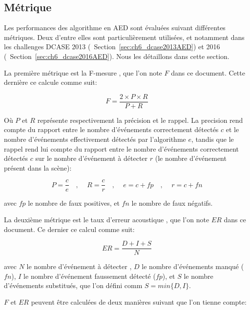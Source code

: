 
\subsection{Métrique}
\label{sec:ch6_metriqueAED}

Les performances des algorithme en AED sont évaluées suivant différentes métriques. Deux d'entre elles sont particulièrement utilisées, et notamment dans les challenges DCASE 2013 (\cf~Section~\ref{sec:ch6_dcase2013AED}) et 2016 (\cf~Section~\ref{sec:ch6_dcase2016AED}). Nous les détaillons dans cette section.

La première métrique est la F-mesure \citep{Giannoulis:2013a,Stowell15}, que l'on note $F$ dans ce document. Cette dernière ce calcule comme suit:

\begin{equation}
F=\dfrac{2\times P \times R}{P+R}
\end{equation}

Où $P$ et $R$ représente respectivement la précision et le rappel. La precision rend compte du rapport entre le nombre d'événements correctement détectés $c$ et le nombre d'événements effectivement détectés par l'algorithme $e$, tandis que le rappel rend lui compte du rapport entre le nombre d'événements correctement détectés $c$ sur le nombre d'événement à détecter $r$ (le nombre d'événement présent dans la scène):

\begin{equation}
P=\dfrac{c}{e}  \quad \textrm{, } \quad R=\dfrac{c}{r} \quad \textrm{, } \quad  e=c+fp \quad \textrm{, } \quad  r=c+fn
\end{equation}

avec $fp$ le nombre de faux positives, et $fn$ le nombre de faux négatifs.


La deuxième métrique est le taux d'erreur acoustique \citep{poliner2007discriminative,clear}, que l'on note $ER$ dans ce document. Ce dernier ce calcul comme suit:

\begin{equation}
ER=\dfrac{D+I+S}{N}
\end{equation}

avec $N$ le nombre d'événement à détecter , $D$ le nombre d'événements manqué ($fn$), $I$ le nombre d'événement faussement détecté ($fp$), et $S$ le nombre d'événements substitués, que l'on défini comm $S=min\lbrace D,I\rbrace$.

$F$ et $ER$ peuvent être calculées de deux manières suivant que l'on tienne compte: 


